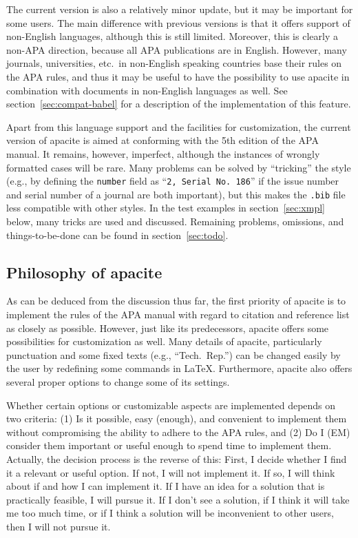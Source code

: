 \documentclass{article}
\newcommand{\pkg}[1]{\textsf{#1}}%
\newcommand{\fname}[1]{\texttt{#1}}%
\newcommand{\fieldname}[1]{\texttt{#1}}%
\begin{document}
The current version is also a relatively minor update, but it may be important
for some users. The main difference with previous versions is that it offers
support of non-English languages, although this is still limited. Moreover,
this is clearly a non-APA direction, because all APA publications are in
English. However, many journals, universities, etc.\ in non-English speaking
countries base their rules on the APA rules, and thus it may be useful to have
the possibility to use \pkg{apacite} in combination with documents in
non-English languages as well. See section~\ref{sec:compat-babel} for a
description of the implementation of this feature.

Apart from this language support and the facilities for customization, the
current version of \pkg{apacite} is aimed at conforming with the 5th edition
of the APA manual. It remains, however, imperfect, although the instances of
wrongly formatted cases will be rare. Many problems can be solved by
``tricking'' the style (e.g., by defining the \fieldname{number} field as
``\verb+2, Serial No. 186+'' if the issue number and serial number of a
journal are both important), but this makes the \fname{.bib} file less
compatible with other styles. In the test examples in section~\ref{sec:xmpl}
below, many tricks are used and discussed. Remaining problems, omissions, and
things-to-be-done can be found in section~\ref{sec:todo}.

\subsection*{Philosophy of \pkg{apacite}}
As can be deduced from the discussion thus far, the first priority of
\pkg{apacite} is to implement the rules of the APA manual with regard to
citation and reference list as closely as possible. However, just like its
predecessors, \pkg{apacite} offers some possibilities for customization as
well. Many details of \pkg{apacite}, particularly punctuation and some fixed
texts (e.g., ``Tech.\ Rep.'') can be changed easily by the user by redefining
some commands in \LaTeX{}. Furthermore, \pkg{apacite} also offers several
proper options to change some of its settings.

Whether certain options or customizable aspects are implemented depends on two
criteria: (1) Is it possible, easy (enough), and convenient to implement them
without compromising the ability to adhere to the APA rules, and (2) Do I (EM)
consider them important or useful enough to spend time to implement them.
Actually, the decision process is the reverse of this: First, I decide whether
I find it a relevant or useful option. If not, I will not implement it. If so,
I will think about if and how I can implement it. If I have an idea for a
solution that is practically feasible, I will pursue it. If I don't see a
solution, if I think it will take me too much time, or if I think a solution
will be inconvenient to other users, then I will not pursue it.
\end{document}
